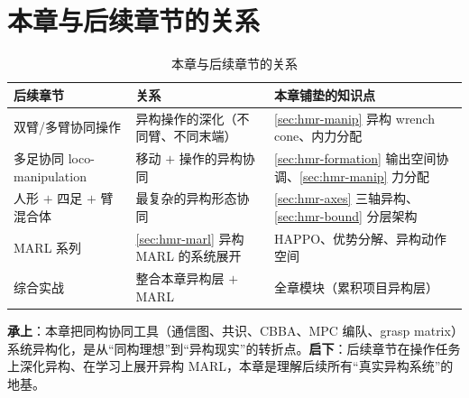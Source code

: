 \section*{本章与后续章节的关系}
\label{sec:hmr-relations}
\begin{table}[H]\centering\small
\caption{本章与后续章节的关系}
\label{tab:hmr-relations}
\begin{tabular}{lll}
\toprule
后续章节 & 关系 & 本章铺垫的知识点 \\
\midrule
双臂/多臂协同操作 & 异构操作的深化（不同臂、不同末端） & \cref{sec:hmr-manip} 异构 wrench cone、内力分配 \\
多足协同 loco-manipulation & 移动 $+$ 操作的异构协同 & \cref{sec:hmr-formation} 输出空间协调、\cref{sec:hmr-manip} 力分配 \\
人形 $+$ 四足 $+$ 臂混合体 & 最复杂的异构形态协同 & \cref{sec:hmr-axes} 三轴异构、\cref{sec:hmr-bound} 分层架构 \\
MARL 系列 & \cref{sec:hmr-marl} 异构 MARL 的系统展开 & HAPPO、优势分解、异构动作空间 \\
综合实战 & 整合本章异构层 $+$ MARL & 全章模块（累积项目异构层） \\
\bottomrule
\end{tabular}
\end{table}
\noindent \textbf{承上}：本章把同构协同工具（通信图、共识、CBBA、MPC 编队、grasp matrix）系统异构化，是从“同构理想”到“异构现实”的转折点。\textbf{启下}：后续章节在操作任务上深化异构、在学习上展开异构 MARL，本章是理解后续所有“真实异构系统”的地基。


